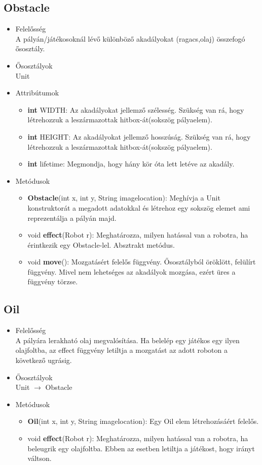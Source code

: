 \subsection{Obstacle}
\begin{itemize}
\item Felelősség\\
A pályán/játékosoknál lévő különböző akadályokat (ragacs,olaj) összefogó ősosztály.
\item Ősosztályok\\
Unit
\item Attribútumok
	\begin{itemize}
		\item \textbf{int} WIDTH: Az akadályokat jellemző szélesség. Szükség van rá, hogy létrehozzuk a leszármazottak hitbox-át(sokszög pályaelem).
		\item \textbf{int} HEIGHT: Az akadályokat jellemző hosszúság. Szükség van rá, hogy létrehozzuk a leszármazottak hitbox-át(sokszög pályaelem).
		\item \textbf{int} lifetime: Megmondja, hogy hány kör óta lett letéve az akadály.
	\end{itemize}
\item Metódusok
	\begin{itemize}
		\item \textbf{Obstacle}(int x, int y, String imagelocation): Meghívja a Unit konstruktorát a megadott adatokkal és létrehoz egy sokszög elemet ami reprezentálja a pályán majd.
		\item void \textbf{effect}(Robot r): Meghatározza, milyen hatással van a robotra, ha érintkezik egy Obstacle-lel. Absztrakt metódus.
		\item void \textbf{move}(): Mozgatásért felelős függvény. Ősosztályból öröklött, felülírt függvény. Mivel nem lehetséges az akadályok mozgása, ezért üres a függvény törzse.
	\end{itemize}
\end{itemize}

\subsection{Oil}
\begin{itemize}
\item Felelősség\\
A pályára lerakható olaj megvalósítása. Ha belelép egy játékos egy ilyen olajfoltba, az effect függvény letiltja a mozgatást az adott roboton a következő ugrásig.
\item Ősosztályok\\
Unit $\rightarrow$ Obstacle 
\item Metódusok
	\begin{itemize}
		\item \textbf{Oil}(int x, int y, String imagelocation): Egy Oil elem létrehozásáért felelős.
		\item void \textbf{effect}(Robot r): Meghatározza, milyen hatással van a robotra, ha beleugrik egy olajfoltba. Ebben az esetben letiltja a játékost, hogy irányt váltson.
	\end{itemize}
\end{itemize}

